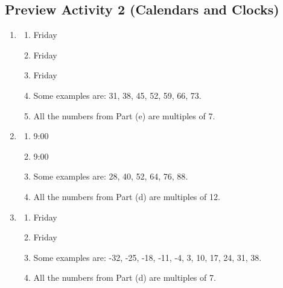 \subsection*{Preview Activity 2 (Calendars and Clocks)}
\begin{enumerate}
\item \begin{multicols}{3} 
\begin{enumerate}
\item Friday

\item Friday

\item Friday
\end{enumerate}
\end{multicols}

\begin{enumerate}
\setcounter{enumii}{3}
\item Some examples are: 31, 38, 45, 52, 59, 66, 73.

\addtocounter{enumii}{1}
\item All the numbers from Part (e) are multiples of 7.
\end{enumerate}

\item \begin{multicols}{2} 
\begin{enumerate}

\item 9:00

\item 9:00
\end{enumerate}
\end{multicols}

\begin{enumerate}
\setcounter{enumii}{2}
\item Some examples are: 28, 40, 52, 64, 76, 88.

\addtocounter{enumii}{1}
\item All the numbers from Part (d) are multiples of 12.
\end{enumerate}

\item \begin{multicols}{2} 
\begin{enumerate}

\item Friday

\item Friday
\end{enumerate}
\end{multicols}

\begin{enumerate}
\setcounter{enumii}{2}
\item Some examples are: -32, -25, -18, -11, -4, 3, 10, 17, 24, 31, 38.

\addtocounter{enumii}{1}
\item All the numbers from Part (d) are multiples of 7.
\end{enumerate}

\end{enumerate}
\hbreak



\newpage

\endinput

